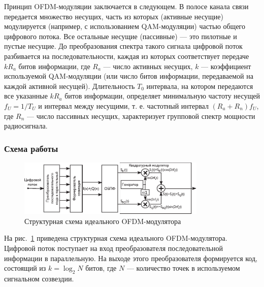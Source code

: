 Принцип OFDM-модуляции заключается в следующем.
В полосе канала связи передается множество несущих, часть из которых (активные несущие) модулируется (например, с использованием QAM-модуляции) частью общего цифрового потока. Все остальные несущие (пассивные) --- это пилотные и пустые несущие. 
До преобразования спектра такого сигнала цифровой поток разбивается на последовательности, каждая из которых соответствует передаче $kR_a$ битов информации, где $R_a$ --- число активных несущих, $k$ --- коэффициент используемой QAM-модуляции (или число битов информации, передаваемой на каждой активной несущей).
Длительность $T_0$ интервала, на котором передаются все указанные $kR_a$ битов информации, определяет минимальную частоту несущей $f_U = 1/T_U$ и интервал между несущими, т. е. частотный интервал $(R_a + R_n)f_U$, где $R_n$ --- число пассивных несущих, характеризует групповой спектр мощности радиосигнала.

\subsubsection{Схема работы}

\begin{figure}[h]
\centering
\includegraphics[width = 0.8\textwidth]{ofdm_mod_sch.pdf}
\caption{Структурная схема идеального OFDM-модулятора}
\label{ofdm_sch}
\end{figure}

На рис.~\ref{ofdm_sch} приведена структурная схема идеального OFDM-модулятора.
Цифровой поток поступает на вход преобразователя последовательной информации в параллельную.
На выходе этого преобразователя формируется код, состоящий из $k = \log_2N$ битов, где $N$ --- количество точек в используемом сигнальном созвездии.

